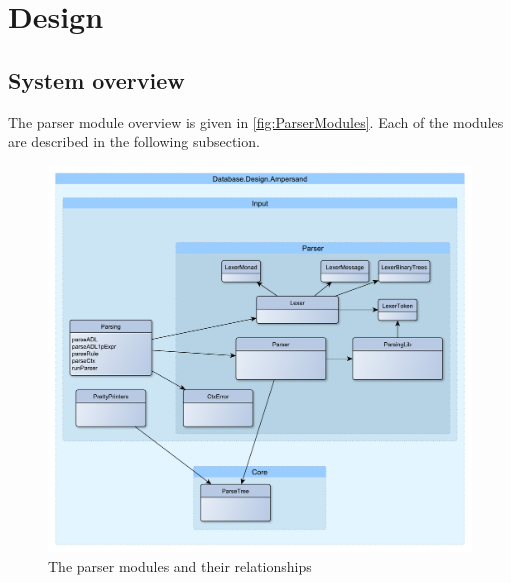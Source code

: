 
\section{Design}
\label{sec:design}

\subsection{System overview}
  The parser module overview is given in \autoref{fig:ParserModules}.
  Each of the modules are described in the following subsection.
  \begin{figure}[ht]%
    \includegraphics[width=\columnwidth]{Figures/ParserModules}
    \caption{The parser modules and their relationships}
    \label{fig:ParserModules}
  \end{figure}%

